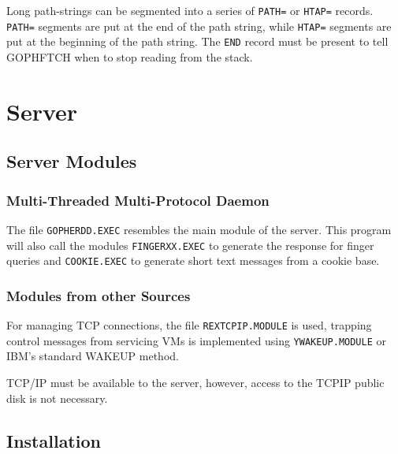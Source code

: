 Long path-strings can be segmented into a series of {\tt PATH=} or
{\tt HTAP=} records.  {\tt PATH=} segments are put at the end of
the path string, while {\tt HTAP=} segments are put at the beginning
of the path string.  The {\tt END} record must be present to tell
GOPHFTCH when to stop reading from the stack.



\section{Server}
 


\subsection{Server Modules}



\subsubsection{Multi-Threaded Multi-Protocol Daemon}
 
The file {\tt GOPHERDD.EXEC} resembles the main module of the server.
This program will also call the modules {\tt FINGERXX.EXEC} to generate
the response for finger queries and {\tt COOKIE.EXEC} to generate
short text messages from a cookie base.
 
 


\subsubsection{Modules from other Sources}

For managing TCP connections, the file {\tt REXTCPIP.MODULE} is used,
trapping control messages from servicing VMs is implemented using
{\tt YWAKEUP.MODULE} or IBM's standard WAKEUP method.
 
TCP/IP must be available to the server, however, access to the TCPIP
public disk is not necessary.
 
 


\subsection{Installation}
 

